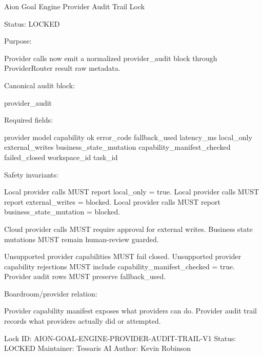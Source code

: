 Aion Goal Engine Provider Audit Trail Lock

Status: LOCKED

Purpose:

Provider calls now emit a normalized provider_audit block through ProviderRouter result raw metadata.

Canonical audit block:

provider_audit

Required fields:

provider
model
capability
ok
error_code
fallback_used
latency_ms
local_only
external_writes
business_state_mutation
capability_manifest_checked
failed_closed
workspace_id
task_id

Safety invariants:

Local provider calls MUST report local_only = true.
Local provider calls MUST report external_writes = blocked.
Local provider calls MUST report business_state_mutation = blocked.

Cloud provider calls MUST require approval for external writes.
Business state mutations MUST remain human-review guarded.

Unsupported provider capabilities MUST fail closed.
Unsupported provider capability rejections MUST include capability_manifest_checked = true.
Provider audit rows MUST preserve fallback_used.

Boardroom/provider relation:

Provider capability manifest exposes what providers can do.
Provider audit trail records what providers actually did or attempted.

Lock ID: AION-GOAL-ENGINE-PROVIDER-AUDIT-TRAIL-V1
Status: LOCKED
Maintainer: Tessaris AI
Author: Kevin Robinson
